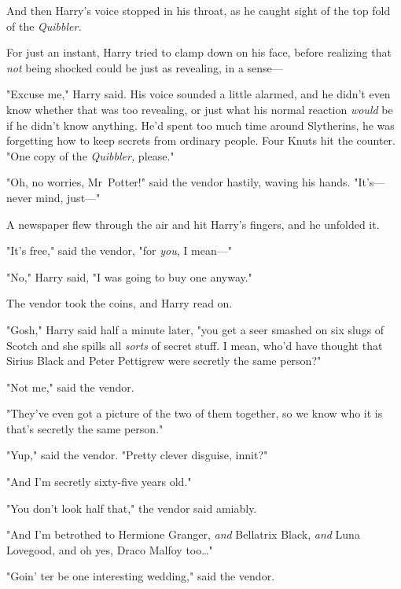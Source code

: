 And then Harry’s voice stopped in his throat, as he caught sight of the top
fold of the \emph{Quibbler.}


For just an instant, Harry tried to clamp down on his face, before realizing
that \emph{not} being shocked could be just as revealing, in a sense—

"Excuse me," Harry said. His voice sounded a little alarmed, and he didn’t even
know whether that was too revealing, or just what his normal reaction
\emph{would} be if he didn’t know anything. He’d spent too much time around
Slytherins, he was forgetting how to keep secrets from ordinary people. Four
Knuts hit the counter. "One copy of the \emph{Quibbler,} please."

"Oh, no worries, Mr~Potter!" said the vendor hastily, waving his hands.
"It’s—never mind, just—"

A newspaper flew through the air and hit Harry’s fingers, and he unfolded it.


"It’s free," said the vendor, "for \emph{you}, I mean—"

"No," Harry said, "I was going to buy one anyway."

The vendor took the coins, and Harry read on.

"Gosh," Harry said half a minute later, "you get a seer smashed on six slugs of
Scotch and she spills all \emph{sorts} of secret stuff. I mean, who’d have
thought that Sirius Black and Peter Pettigrew were secretly the same person?"

"Not me," said the vendor.

"They’ve even got a picture of the two of them together, so we know who it is
that’s secretly the same person."

"Yup," said the vendor. "Pretty clever disguise, innit?"

"And I’m secretly sixty-five years old."

"You don’t look half that," the vendor said amiably.

"And I’m betrothed to Hermione Granger, \emph{and} Bellatrix Black, \emph{and}
Luna Lovegood, and oh yes, Draco Malfoy too…"

"Goin’ ter be one interesting wedding," said the vendor.

